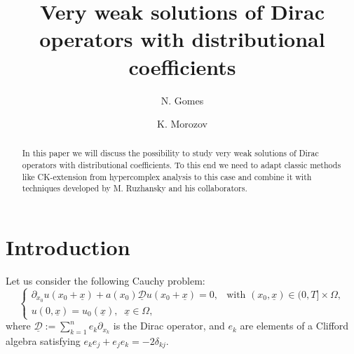 \documentclass[12pt]{amsart}
\newcommand{\D}{\mathcal{D}}
\theoremstyle{definition}
\newcommand{\un}{\underline}
\begin{document}
\title[Dirac operators with distributional coefficients]{Very weak solutions of Dirac operators with distributional coefficients }


\author[N. Gomes]{N. Gomes}
\address{(NG) CIDMA - Center for Research and Development in Mathematics and Applications, \newline Universidade de Cabo Verde \newline Campus 
  \newline Praia, Cabo Verde}
\email{}

\author[K. Morozov]{K. Morozov}
\address{(KM) CIDMA - Center for Research and Development in Mathematics and Applications, \newline Department of Mathematics, University of Aveiro \newline Campus Universit\'ario de Santiago
  -193 Aveiro, Portugal}
\email{}

%
%
%





\begin{abstract}
In this paper we will discuss the possibility to study very weak solutions of Dirac operators with distributional coefficients. To this end we need to adapt classic methods like CK-extension from hypercomplex analysis to this case and combine it with techniques developed by M. Ruzhansky and his collaborators. 
\end{abstract}

\maketitle



\section{Introduction}



Let us  consider the following Cauchy problem:
\begin{equation}
  \begin{cases}
\partial_{x_0} u(x_0+\un{x}) + a(x_0)\un{\D} u(x_0+\un{x}) = 0, & \text{with } (x_0, \un{x}) \in (0, T]\times\Omega, \\
u(0,\un{x}) = u_0(\un{x}),\;\; \un{x}\in \Omega,
\end{cases}
\label{CP}  
\end{equation}
where $\un{\D} := \sum_{k=1}^n e_k \partial_{x_k}$ is the Dirac operator, and $e_k$ are elements of a Clifford algebra satisfying $e_k e_j + e_j e_k = -2\delta_{kj}$.
\end{document}
